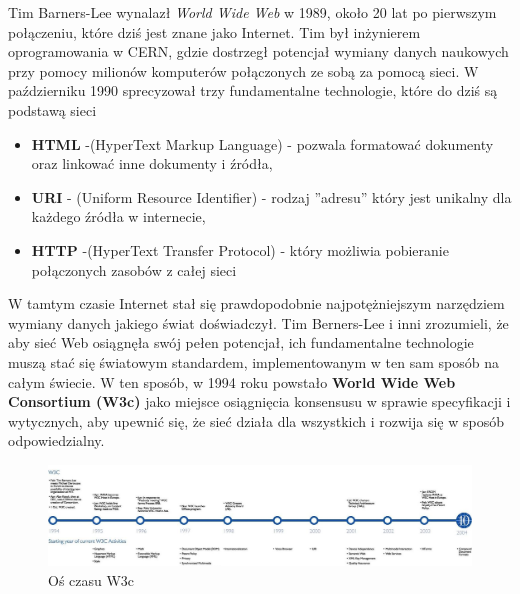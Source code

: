 \documentclass[12pt]{report}
\begin{document}
	Tim Barners-Lee wynalazł \textit{World Wide Web} w  1989, około 20 lat po pierwszym połączeniu, które dziś jest znane 
	jako Internet. Tim był inżynierem oprogramowania w CERN, gdzie dostrzegł potencjał wymiany danych naukowych przy pomocy
	milionów komputerów połączonych ze sobą za pomocą sieci.
	\newline
	W październiku 1990 sprecyzował trzy fundamentalne technologie, które do dziś są podstawą sieci
	\begin{itemize}
	\item \textbf{HTML} -(HyperText Markup Language) - pozwala formatować dokumenty oraz linkować inne dokumenty i źródła,
	\item \textbf{URI} - (Uniform Resource Identifier) - rodzaj ''adresu'' który jest unikalny dla każdego źródła w internecie,
	\item \textbf{HTTP} -(HyperText Transfer Protocol) - który możliwia pobieranie połączonych zasobów z całej sieci
	\end{itemize}
	
	W tamtym czasie Internet stał się prawdopodobnie najpotężniejszym narzędziem wymiany danych jakiego świat doświadczył. 
	\newline
	Tim Berners-Lee i inni zrozumieli, że aby sieć Web osiągnęła swój pełen potencjał, ich fundamentalne technologie muszą stać
	się światowym standardem, implementowanym w ten sam sposób na całym świecie. W ten sposób, w 1994 roku powstało
	\textbf{World Wide Web Consortium (W3c)} jako miejsce osiągnięcia konsensusu w sprawie specyfikacji i wytycznych, aby upewnić
	się, że sieć działa dla wszystkich i rozwija się w sposób odpowiedzialny.
	
	\begin{figure}[h]
	\includegraphics[width=\textwidth]{timeline.jpg}
	\caption{Oś czasu W3c}
	\end{figure}
	
	\cite{history}
	
	
\end{document}
